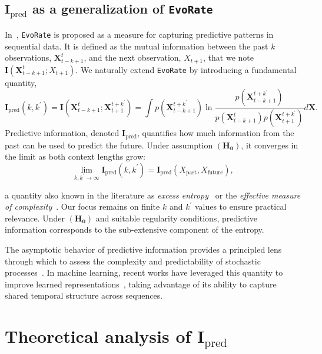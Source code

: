 \documentclass{article}
\begin{document}
\subsection{$\mathbf{I}_{\text{pred}}$ as a generalization of \texttt{EvoRate}}
In~\citet{zeng2025towards}, \texttt{EvoRate} is proposed as a measure for capturing predictive patterns in sequential data. It is defined as the mutual information between the past $k$ observations, $\mathbf{X}_{t-k+1}^{t}$, and the next observation, $X_{t+1}$, that we note $\mathbf{I}(\mathbf{X}_{t-k+1}^{t}; X_{t+1})$.
We naturally extend \texttt{EvoRate} by introducing a fundamental quantity,
\begin{equation}\label{eq:evo_pred_def}
\mathbf{I}_{\text{pred}}(k,k^\prime) = \mathbf{I}(\mathbf{X}_{t-k+1}^{t}; \mathbf{X}_{t+1}^{t+k^\prime}) = \int p(\mathbf{X}_{t-k+1}^{t+k^\prime}) \ln \frac{p(\mathbf{X}_{t-k+1}^{t+k^\prime})}{p(\mathbf{X}_{t-k+1}^{t})p(\mathbf{X}_{t+1}^{t+k^\prime})} d\mathbf{X}.
\end{equation}
Predictive information, denoted $\mathbf{I}_{\text{pred}}$, quantifies how much information from the past can be used to predict the future. Under assumption $\mathbf{(H_{0})}$, it converges in the limit as both context lengths grow:
\begin{equation}
\lim_{k, k^\prime \to \infty} \mathbf{I}_{\text{pred}}(k, k^\prime) = \mathbf{I}_{\text{pred}}(X_{\text{past}}, X_{\text{future}}),
\end{equation}

a quantity also known in the literature as \emph{excess entropy}~\cite{crutchfield1983symbolic, crutchfield1997statistical, feldman1998discovering} or the \emph{effective measure of complexity}~\cite{grassberger1986toward}. Our focus remains on finite $k$ and $k^\prime$ values to ensure practical relevance.
Under $\mathbf{(H_{0})}$ and suitable regularity conditions, predictive information corresponds to the sub-extensive component of the entropy.

The asymptotic behavior of predictive information provides a principled lens through which to assess the complexity and predictability of stochastic processes~\cite{bialek1999predictive, crutchfield2003regularities}. In machine learning, recent works have leveraged this quantity to improve learned representations~\cite{lee2020predictive, fischer2020conditional}, taking advantage of its ability to capture shared temporal structure across sequences.

\section{Theoretical analysis of $\mathbf{I}_{\text{pred}}$}
\end{document}
